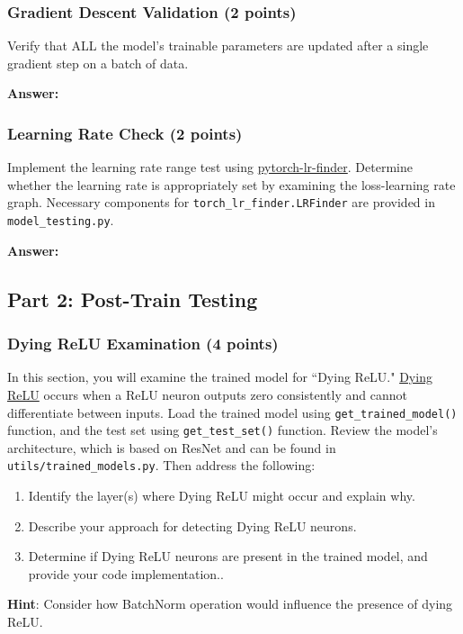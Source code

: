 \documentclass[11pt, oneside]{article}   	%
\begin{document}
\subsubsection*{Gradient Descent Validation (2 points)}
Verify that ALL the model's trainable parameters are updated after a single gradient step on a batch of data.

\begin{answerbox} \textbf{Answer:} \vspace*{1cm}

\end{answerbox}


\subsubsection*{Learning Rate Check (2 points)}
 Implement the learning rate range test using \href{https://github.com/davidtvs/pytorch-lr-finder#tweaked-version-from-fastaiauto}{pytorch-lr-finder}. Determine whether the learning rate is appropriately set by examining the loss-learning rate graph. Necessary components for \texttt{torch\_lr\_finder.LRFinder} are provided in \texttt{model\_testing.py}.


\begin{answerbox} \textbf{Answer:} \vspace*{1cm}

\end{answerbox}

\subsection*{Part 2: Post-Train Testing}

\subsubsection*{Dying ReLU Examination (4 points)}
In this section, you will examine the trained model for ``Dying ReLU." \href{https://datascience.stackexchange.com/questions/5706/what-is-the-dying-relu-problem-in-neural-networks}{Dying ReLU} occurs when a ReLU neuron outputs zero consistently and cannot differentiate between inputs. 
Load the trained model using \texttt{get\_trained\_model()} function, and the test set using \texttt{get\_test\_set()} function. Review the model's architecture, which is based on ResNet and can be found in \texttt{utils/trained\_models.py}. Then address the following:


\begin{enumerate}
    \item Identify the layer(s) where Dying ReLU might occur and explain why.
    \item Describe your approach for detecting Dying ReLU neurons. 
    \item Determine if Dying ReLU neurons are present in the trained model, and provide your code implementation..
\end{enumerate}
\textbf{Hint}: Consider how BatchNorm operation would influence the presence of dying ReLU.
    
\end{document}
